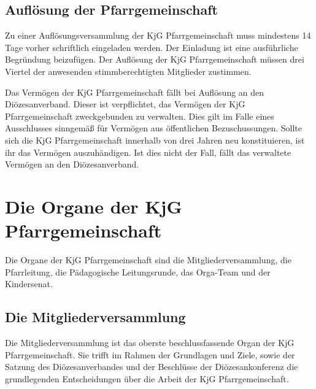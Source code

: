 \documentclass[12pt]{report}
\begin{document}
\begin{justify}
\subsection{Auflösung der Pfarrgemeinschaft}
Zu einer Auflösungsversammlung der KjG Pfarrgemeinschaft muss mindestens 14 Tage vorher
schriftlich eingeladen werden. Der Einladung ist eine ausführliche Begründung beizufügen. Der
Auflösung der KjG Pfarrgemeinschaft müssen drei Viertel der anwesenden stimmberechtigten
Mitglieder zustimmen.

Das Vermögen der KjG Pfarrgemeinschaft fällt bei Auflösung an den Diözesanverband.
Dieser ist verpflichtet, das Vermögen der KjG Pfarrgemeinschaft zweckgebunden zu verwalten.
Dies gilt im Falle eines Ausschlusses sinngemäß für Vermögen aus öffentlichen Bezuschussungen.
Sollte sich die KjG Pfarrgemeinschaft innerhalb von drei Jahren neu konstituieren, ist ihr das
Vermögen auszuhändigen. Ist dies nicht der Fall, fällt das verwaltete Vermögen an den Diözesanverband.

\section{Die Organe der KjG Pfarrgemeinschaft}
Die Organe der KjG Pfarrgemeinschaft sind die Mitgliederversammlung, die Pfarrleitung,
die Pädagogische Leitungsrunde, das Orga-Team und der Kindersenat.

\subsection{Die Mitgliederversammlung}
Die Mitgliederversammlung ist das oberste beschlussfassende Organ der KjG Pfarrgemeinschaft.
Sie trifft im Rahmen der Grundlagen und Ziele, sowie der Satzung des Diözesanverbandes und
der Beschlüsse der Diözesankonferenz die grundlegenden Entscheidungen über die Arbeit der
KjG Pfarrgemeinschaft.


\end{justify}
\end{document}
